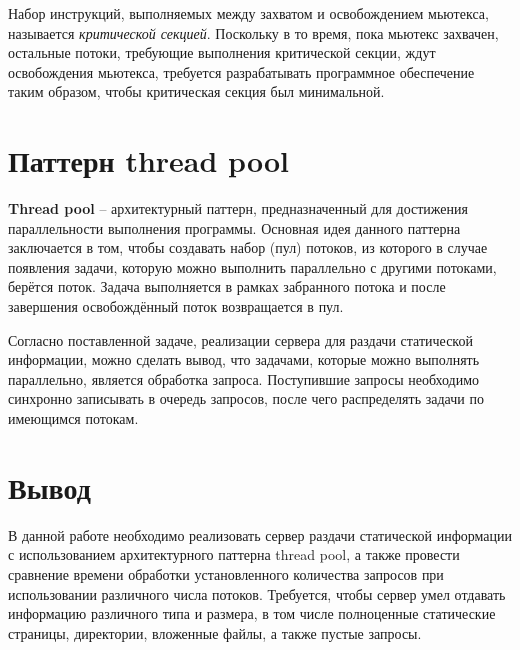 Набор инструкций, выполняемых между захватом и освобождением мьютекса, называется \textit{критической секцией}. 
Поскольку в то время, пока мьютекс захвачен, остальные потоки, требующие выполнения критической секции, ждут освобождения мьютекса, требуется разрабатывать программное обеспечение таким образом, чтобы критическая секция был минимальной.

\section{Паттерн thread pool}
\textbf{Thread pool} \cite{thread-pool}	 -- архитектурный паттерн, предназначенный для достижения параллельности выполнения программы. 
Основная идея данного паттерна заключается в том, чтобы создавать набор (пул) потоков, из которого в случае появления задачи, которую можно выполнить параллельно с другими потоками, берётся поток.
Задача выполняется в рамках забранного потока и после завершения освобождённый поток возвращается в пул.

Согласно поставленной задаче, реализации сервера для раздачи статической информации, можно сделать вывод, что задачами, которые можно выполнять параллельно, является обработка запроса. Поступившие запросы необходимо синхронно записывать в очередь запросов, после чего распределять задачи по имеющимся потокам.

\section*{Вывод}
В данной работе необходимо реализовать сервер раздачи статической информации с использованием архитектурного паттерна thread pool, а также провести сравнение времени обработки установленного количества запросов при использовании различного числа потоков. Требуется, чтобы сервер умел отдавать информацию различного типа и размера, в том числе полноценные статические страницы, директории, вложенные файлы, а также пустые запросы.